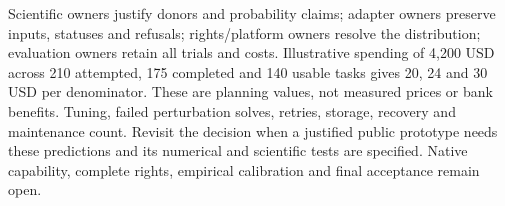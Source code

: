 Scientific owners justify donors and probability claims; adapter owners
preserve inputs, statuses and refusals; rights/platform owners resolve
the distribution; evaluation owners retain all trials and costs.
Illustrative spending of 4,200 USD across 210 attempted, 175 completed
and 140 usable tasks gives 20, 24 and 30 USD per denominator. These are
planning values, not measured prices or bank benefits. Tuning, failed
perturbation solves, retries, storage, recovery and maintenance count.
Revisit the decision when a justified public prototype needs these
predictions and its numerical and scientific tests are specified.
Native capability, complete rights, empirical calibration and final
acceptance remain open.\citep{exec24_scpi_choice}
